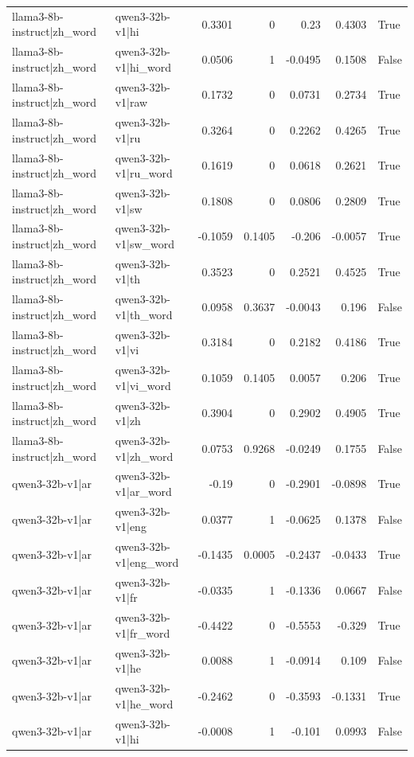 \begin{table}
\begin{tabular}{l l r r r r l}
llama3-8b-instruct|zh_word & qwen3-32b-v1|hi & 0.3301 & 0 & 0.23 & 0.4303 & True \\
llama3-8b-instruct|zh_word & qwen3-32b-v1|hi_word & 0.0506 & 1 & -0.0495 & 0.1508 & False \\
llama3-8b-instruct|zh_word & qwen3-32b-v1|raw & 0.1732 & 0 & 0.0731 & 0.2734 & True \\
llama3-8b-instruct|zh_word & qwen3-32b-v1|ru & 0.3264 & 0 & 0.2262 & 0.4265 & True \\
llama3-8b-instruct|zh_word & qwen3-32b-v1|ru_word & 0.1619 & 0 & 0.0618 & 0.2621 & True \\
llama3-8b-instruct|zh_word & qwen3-32b-v1|sw & 0.1808 & 0 & 0.0806 & 0.2809 & True \\
llama3-8b-instruct|zh_word & qwen3-32b-v1|sw_word & -0.1059 & 0.1405 & -0.206 & -0.0057 & True \\
llama3-8b-instruct|zh_word & qwen3-32b-v1|th & 0.3523 & 0 & 0.2521 & 0.4525 & True \\
llama3-8b-instruct|zh_word & qwen3-32b-v1|th_word & 0.0958 & 0.3637 & -0.0043 & 0.196 & False \\
llama3-8b-instruct|zh_word & qwen3-32b-v1|vi & 0.3184 & 0 & 0.2182 & 0.4186 & True \\
llama3-8b-instruct|zh_word & qwen3-32b-v1|vi_word & 0.1059 & 0.1405 & 0.0057 & 0.206 & True \\
llama3-8b-instruct|zh_word & qwen3-32b-v1|zh & 0.3904 & 0 & 0.2902 & 0.4905 & True \\
llama3-8b-instruct|zh_word & qwen3-32b-v1|zh_word & 0.0753 & 0.9268 & -0.0249 & 0.1755 & False \\
qwen3-32b-v1|ar & qwen3-32b-v1|ar_word & -0.19 & 0 & -0.2901 & -0.0898 & True \\
qwen3-32b-v1|ar & qwen3-32b-v1|eng & 0.0377 & 1 & -0.0625 & 0.1378 & False \\
qwen3-32b-v1|ar & qwen3-32b-v1|eng_word & -0.1435 & 0.0005 & -0.2437 & -0.0433 & True \\
qwen3-32b-v1|ar & qwen3-32b-v1|fr & -0.0335 & 1 & -0.1336 & 0.0667 & False \\
qwen3-32b-v1|ar & qwen3-32b-v1|fr_word & -0.4422 & 0 & -0.5553 & -0.329 & True \\
qwen3-32b-v1|ar & qwen3-32b-v1|he & 0.0088 & 1 & -0.0914 & 0.109 & False \\
qwen3-32b-v1|ar & qwen3-32b-v1|he_word & -0.2462 & 0 & -0.3593 & -0.1331 & True \\
qwen3-32b-v1|ar & qwen3-32b-v1|hi & -0.0008 & 1 & -0.101 & 0.0993 & False \\

\end{tabular}
\end{table}
